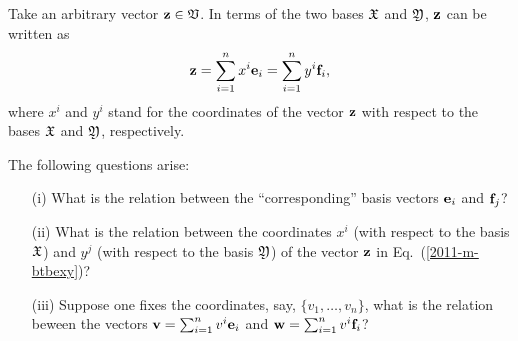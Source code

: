 Take an arbitrary vector ${\bf z}\in {\frak V}$.
In terms of the two bases
${\frak X}$ and
${\frak Y}$,
${\bf z}$ can be written as
\begin{equation}
{\bf z}=
\sum_{i=1}^n x^i{\bf e}_i
=
\sum_{i=1}^n  y^i{\bf f}_i,
\label{2011-m-btbexy}
\end{equation}
where $x^i$ and $y^i$ stand for the coordinates of the vector  ${\bf z}$
with respect to the bases ${\frak X}$ and
${\frak Y}$,
respectively.

The following questions arise:
\begin{itemize}
\item[(i)]
What is the relation between the ``corresponding'' basis vectors ${\bf e}_i$ and ${\bf f}_j$?
\item[(ii)]
What is the relation between the coordinates $x^i$ (with respect to the basis  ${\frak X}$) and $y^j$ (with respect to the basis  ${\frak Y}$)  of the vector ${\bf z}$ in Eq.~(\ref{2011-m-btbexy})?
\item[(iii)]
Suppose one fixes the coordinates, say, $\{
{v}_1,
\ldots ,
{v}_n
\}$, what is the relation beween the vectors
${\bf v}=
\sum_{i=1}^n v^i{\bf e}_i
$
and
${\bf w}=
\sum_{i=1}^n v^i{\bf f}_i
$?
\end{itemize}

